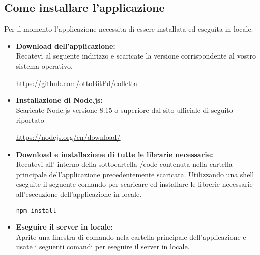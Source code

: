 \subsection{Come installare l'applicazione}
Per il momento l'applicazione necessita di essere installata ed eseguita in locale.
\begin{itemize}
	\item \textbf{Download dell'applicazione:}\\
Recatevi al seguente indirizzo e scaricate la versione corrispondente al vostro sistema operativo.
\begin{center}
	\url{https://github.com/ottoBitPd/colletta} 	
\end{center}


	\item \textbf{Installazione di Node.js:}\\
Scaricate Node.js versione 8.15 o superiore dal sito ufficiale di seguito riportato 
\begin{center}
	\url{https://nodejs.org/en/download/}
\end{center}

	\item \textbf{Download e installazione di tutte le librarie necessarie:}\\ 
Recatevi all' interno della sottocartella /code contenuta nella cartella principale dell'applicazione precedentemente scaricata. Utilizzando una shell eseguite il seguente comando per scaricare ed installare le librerie necessarie all'esecuzione dell'applicazione in locale.

\begin{lstlisting}[xleftmargin=.25\textwidth,xrightmargin=.25\textwidth]
npm install 
\end{lstlisting}
	\item \textbf{Eseguire il server in locale:}\\
Aprite una finestra di comando nela cartella principale dell'applicazione e usate i seguenti comandi per eseguire il server in locale.

\begin{center}
	\noindent{}

\end{center}

\end{itemize}
